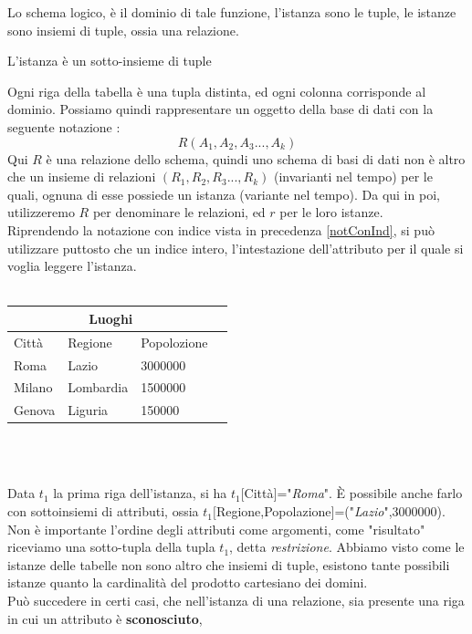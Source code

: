 \documentclass[12pt, letterpaper]{article}
\begin{document}
Lo schema logico, è il dominio di tale funzione, l'istanza sono le tuple, le istanze sono insiemi di tuple,
ossia una relazione.
\begin{theorem}
    L'istanza è un sotto-insieme di tuple
\end{theorem}
Ogni riga della tabella è una tupla distinta, ed ogni colonna corrisponde al dominio. Possiamo quindi rappresentare
un oggetto della base di dati con la seguente notazione : 
\begin{equation}
    R(A_1,A_2,A_3...,A_k)
\end{equation}
Qui \(R\) è una relazione dello schema, quindi uno schema di basi di dati non è altro che un 
insieme di relazioni \((R_1,R_2,R_3...,R_k)\) (invarianti nel tempo) per le quali, ognuna di esse possiede un istanza (variante nel tempo).
Da qui in poi, utilizzeremo \(R\) per denominare le relazioni, ed \(r\) per le loro istanze.\\
Riprendendo la notazione con indice vista in precedenza \ref{notConInd}, si può utilizzare puttosto
che un indice intero, l'intestazione dell'attributo per il quale si voglia leggere l'istanza.\\
\centering
\hphantom{.}\\
\begin{tabular}{|l|l|l|r|}
    \hline
\multicolumn{3}{|c|}{\textbf{Luoghi}}\\
    \hline
    Città & Regione & Popolozione \\
    \hline
    Roma & Lazio & 3000000 \\
    \hline
    Milano & Lombardia & 1500000 \\
    \hline
    Genova & Liguria & 150000 \\
    \hline
    \end{tabular}
\\ 
 \hphantom{.}\\
 \raggedright
 Data \(t_1\) la prima riga dell'istanza, si ha \(t_1[\)Città\(]\)="\textit{Roma}". È possibile anche farlo
 con sottoinsiemi di attributi, ossia \(t_1[\)Regione,Popolazione\(]\)=("\textit{Lazio}",\(3000000\)). Non è importante
 l'ordine degli attributi come argomenti, come "risultato" riceviamo una sotto-tupla della tupla \(t_1\), detta \textit{restrizione}.
Abbiamo visto come le istanze delle tabelle non sono altro che insiemi di tuple, esistono tante possibili istanze quanto la cardinalità
del prodotto cartesiano dei domini.\\
Può succedere in certi casi, che nell'istanza di una relazione, sia presente una riga in cui un attributo è \textbf{sconosciuto},
\end{document}

